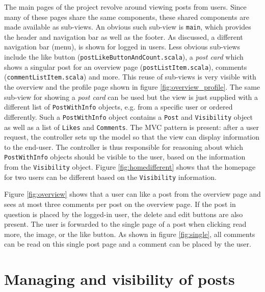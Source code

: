 The main pages of the project revolve around viewing posts from users.
Since many of these pages share the same components, these shared components are made available as sub-views.
An obvious such sub-view is \texttt{main}, which provides the header and navigation bar as well as the footer.
As discussed, a different navigation bar (menu), is shown for logged in users.
Less obvious sub-views include the like button (\texttt{postLikeButtonAndCount.scala}), a \textit{post card} which shows a singular post for an overview page (\texttt{postListItem.scala}), comments (\texttt{commentListItem.scala}) and more.
This reuse of sub-views is very visible with the overview and the profile page shown in figure \ref{fig:overview_profile}.
The same sub-view for showing a \textit{post card} can be used but the view is just supplied with a different list of \texttt{PostWithInfo} objects, e.g. from a specific user or ordered differently.
Such a \texttt{PostWithInfo} object contains a \texttt{Post} and \texttt{Visibility} object as well as a list of \texttt{Likes} and \texttt{Comments}.
The MVC pattern is present: after a user request, the controller sets up the model so that the view can display information to the end-user.
The controller is thus responsible for reasoning about which \texttt{PostWithInfo} objects should be visible to the user, based on the information from the \texttt{Visibility} object.
Figure \ref{fig:homedifferent} shows that the homepage for two users can be different based on the \texttt{Visibility} information.

Figure \ref{fig:overview} shows that a user can like a post from the overview page and sees at most three comments per post on the overview page.
If the post in question is placed by the logged-in user, the delete and edit buttons are also present.
The user is forwarded to the single page of a post when clicking read more, the image, or the like button.
As shown in figure \ref{fig:single}, all comments can be read on this single post page and a comment can be placed by the user.

\clearpage
\section{Managing and visibility of posts}
\label{sec:managing}

